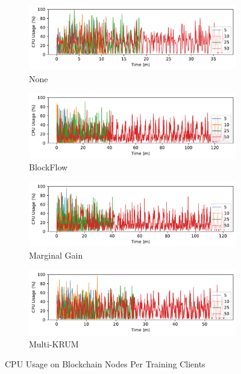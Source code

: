 \begin{figure}[!h]
    \centering
    \begin{subfigure}[b]{0.49\textwidth}
        \centering
        \includegraphics[width=\textwidth]{graphics/clients/cpu_none_miner.pdf}
        \caption{None}
    \end{subfigure}
    \hfill
    \begin{subfigure}[b]{0.49\textwidth}
        \centering
        \includegraphics[width=\textwidth]{graphics/clients/cpu_blockflow_miner.pdf}
        \caption{BlockFlow}
    \end{subfigure}
    \hfill
    \begin{subfigure}[b]{0.49\textwidth}
        \centering
        \includegraphics[width=\textwidth]{graphics/clients/cpu_marginalgain_miner.pdf}
        \caption{Marginal Gain}
    \end{subfigure}
    \hfill
    \begin{subfigure}[b]{0.49\textwidth}
        \centering
        \includegraphics[width=\textwidth]{graphics/clients/cpu_multikrum_miner.pdf}
        \caption{Multi-KRUM}
    \end{subfigure}
    \caption{CPU Usage on Blockchain Nodes Per Training Clients}
    \label{fig:cpu_clients_degree_miner}
\end{figure}
